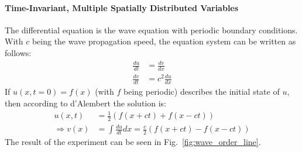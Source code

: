 \paragraph*{Time-Invariant, Multiple Spatially Distributed Variables}
The differential equation is the wave equation with periodic boundary conditions.
With $c$ being the wave propagation speed, the equation system can be written as follows:
\begin{align*}
\frac{du}{dt}&=\frac{dv}{dx}\\
\frac{dv}{dt}&=c^2\frac{du}{dx}
\end{align*}
If $u(x,t=0)=f(x)$ (with $f$ being periodic) describes the initial state of $u$, then according to d'Alembert the solution is:
\begin{align*}
u(x,t)&=\frac{1}{2}(f(x+ct)+f(x-ct))\\
\Rightarrow v(x)&=\int \frac{du}{dt} dx = \frac{c}{2}(f(x+ct)-f(x-ct))
\end{align*}
The result of the experiment can be seen in Fig.~\ref{fig:wave_order_line}.

